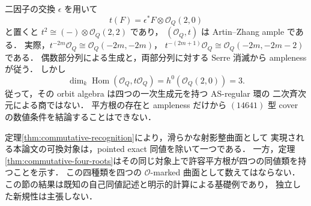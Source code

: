 \begin{example}
\label{ex:commutative-unbalanced-root}
二因子の交換 $\epsilon$ を用いて
\[
 t(F)=\epsilon^*F\otimes\mathcal O_Q(2,0)
\]
と置くと $t^2\cong(-)\otimes\mathcal O_Q(2,2)$ であり，
$(\mathcal O_Q,t)$ は Artin--Zhang ample である．
実際，$t^{-2m}\mathcal O_Q\cong\mathcal O_Q(-2m,-2m)$，
$t^{-(2m+1)}\mathcal O_Q\cong\mathcal O_Q(-2m,-2m-2)$ である．
偶数部分列による生成と，両部分列に対する Serre 消滅から ampleness が従う．
しかし
\[
 \dim_k\operatorname{Hom}(\mathcal O_Q,t\mathcal O_Q)
 =h^0(\mathcal O_Q(2,0))=3.
\]
従って，その orbit algebra は四つの一次生成元を持つ AS-regular 環の
二次斉次元による商ではない．
平方根の存在と ampleness だけから $(14641)$ 型 cover の数値条件を結論することはできない．
\end{example}

\begin{remark}[対象と根の区別]
定理\ref{thm:commutative-recognition}により，滑らかな射影整曲面として
実現される本論文の可換対象は，pointed exact 同値を除いて一つである．
一方，定理\ref{thm:commutative-four-roots}はその同じ対象上で許容平方根が四つの同値類を持つことを示す．
この四種類を四つの $\mathcal O$-marked 曲面として数えてはならない．
この節の結果は既知の自己同値記述と明示的計算による基礎例であり，
独立した新規性は主張しない．
\end{remark}
